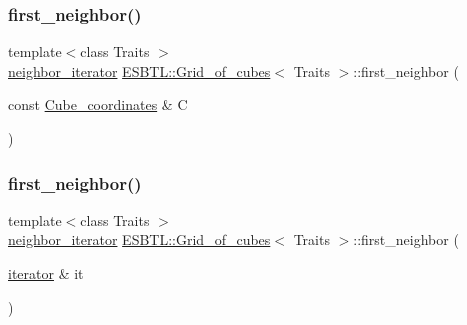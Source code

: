 \mbox{\label{structESBTL_1_1Grid__of__cubes_a375871e53ca8ffc12618b5ab4a949f86}} 
\subsubsection{\texorpdfstring{first\+\_\+neighbor()}{first\_neighbor()}\hspace{0.1cm}{\footnotesize\ttfamily [1/2]}}
{\footnotesize\ttfamily template$<$class Traits $>$ \\
\hyperlink{classESBTL_1_1Grid__of__cubes_1_1neighbor__iterator}{neighbor\+\_\+iterator} \hyperlink{structESBTL_1_1Grid__of__cubes}{E\+S\+B\+T\+L\+::\+Grid\+\_\+of\+\_\+cubes}$<$ Traits $>$\+::first\+\_\+neighbor (\begin{DoxyParamCaption}\item[{const \hyperlink{structESBTL_1_1Grid__of__cubes_ad55c84346bab961e08d95e494551d07d}{Cube\+\_\+coordinates} \&}]{C }\end{DoxyParamCaption})\hspace{0.3cm}{\ttfamily [inline]}}

\mbox{\label{structESBTL_1_1Grid__of__cubes_a4ea3f48bef443c08ef8551cc2ebf2016}} 
\subsubsection{\texorpdfstring{first\+\_\+neighbor()}{first\_neighbor()}\hspace{0.1cm}{\footnotesize\ttfamily [2/2]}}
{\footnotesize\ttfamily template$<$class Traits $>$ \\
\hyperlink{classESBTL_1_1Grid__of__cubes_1_1neighbor__iterator}{neighbor\+\_\+iterator} \hyperlink{structESBTL_1_1Grid__of__cubes}{E\+S\+B\+T\+L\+::\+Grid\+\_\+of\+\_\+cubes}$<$ Traits $>$\+::first\+\_\+neighbor (\begin{DoxyParamCaption}\item[{\hyperlink{classESBTL_1_1Grid__of__cubes_1_1iterator}{iterator} \&}]{it }\end{DoxyParamCaption})\hspace{0.3cm}{\ttfamily [inline]}}

